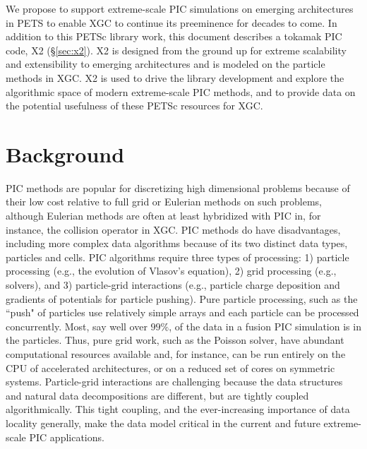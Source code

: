 \documentclass[review]{siamart}
\begin{document}
We propose to support extreme-scale PIC simulations on emerging architectures in PETS to enable XGC to continue its preeminence for decades to come.
In addition to this PETSc library work, this document describes a tokamak PIC code, X2 (\S\ref{sec:x2}).
X2 is designed from the ground up for extreme scalability and extensibility to emerging architectures and is modeled on the particle methods in XGC.
X2 is used to drive the library development and explore the algorithmic space of modern extreme-scale PIC methods, and to provide data on the potential usefulness of these PETSc resources for XGC.

\section{Background}

PIC methods are popular for discretizing high dimensional problems because of their low cost relative to full grid or Eulerian methods on such problems, although Eulerian methods are often at least hybridized with PIC in, for instance, the collision operator in XGC.
PIC methods do have disadvantages, including more complex data algorithms because of its two distinct data types, particles and cells.
PIC algorithms require three types of processing: 1) particle processing (e.g., the evolution of Vlasov's equation), 2) grid processing (e.g., solvers), and 3) particle-grid interactions (e.g., particle charge deposition and gradients of potentials for particle pushing).
Pure particle processing, such as the ``push" of particles use relatively simple arrays and each particle can be processed concurrently.
Most, say well over $99\%$, of the data in a fusion PIC simulation is in the particles.
Thus, pure grid work, such as the Poisson solver, have abundant computational resources available and, for instance, can be run entirely on the CPU of accelerated architectures, or on a reduced set of cores on symmetric systems.
Particle-grid interactions are challenging because the data structures and natural data decompositions are different, but are tightly coupled algorithmically.
This tight coupling, and the ever-increasing importance of data locality generally, make the data model critical in the current and future extreme-scale PIC applications.
\end{document}
